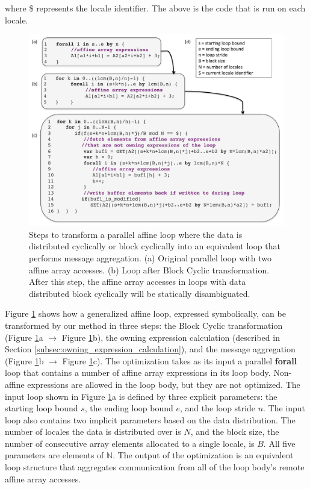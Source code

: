 where \$ represents the locale identifier. The above is the code that is run on each locale.

\begin{figure}
	\begin{center}
	\includegraphics[scale=0.41]{./Figures/transformations}
	\caption{Steps to transform a parallel affine loop where the data is distributed cyclically or block cyclically into an equivalent loop that performs message aggregation. (a) Original parallel loop with two affine array accesses. (b) Loop after Block Cyclic transformation. After this step, the affine array accesses in loops with data distributed block cyclically will be statically disambiguated. }
	\label{transformations}
	\end{center}
\end{figure}

Figure \ref{transformations} shows how a generalized affine loop, expressed symbolically, can be transformed by our method in three steps: the Block Cyclic transformation (Figure \ref{transformations}a $\rightarrow$ Figure \ref{transformations}b), the owning expression calculation (described in Section \ref{subsec:owning_expression_calculation}), and the message aggregation (Figure \ref{transformations}b $\rightarrow$ Figure \ref{transformations}c). The optimization takes as its input a parallel \textbf{forall} loop that contains a number of affine array expressions in its loop body. Non-affine expressions are allowed in the loop body, but they are not optimized. The input loop shown in Figure \ref{transformations}a is defined by three explicit parameters: the starting loop bound $s$, the ending loop bound $e$, and the loop stride $n$. The input loop also contains two implicit parameters based on the data distribution. The number of locales the data is distributed over is $N$, and the block size, the number of consecutive array elements allocated to a single locale, is $B$. All five parameters are elements of $\mathbb{N}$. The output of the optimization is an equivalent loop structure that aggregates communication from all of the loop body's remote affine array accesses.

